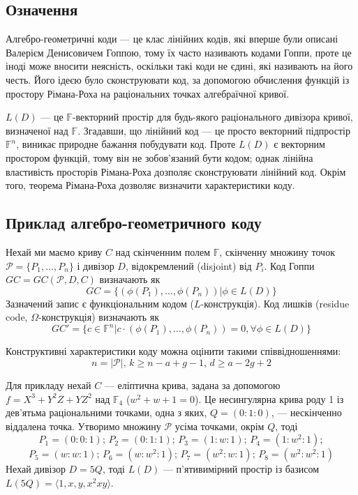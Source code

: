 \documentclass[a4paper,12pt,oneside]{article}
\begin{document}
\subsection{Означення}
Алгебро-геометричні коди --- це клас лінійних кодів, які вперше були описані Валерієм Денисовичем Гоппою, 
тому їх часто називають кодами Гоппи, проте це іноді може вносити неясність, оскільки такі коди не єдині, які називають на його честь. 
Його ідеєю було сконструювати код, за допомогою обчислення функцій із простору Рімана-Роха на раціональних точках алгебраїчної кривої. 

$L(D)$ --- це $\mathbb{F}$-векторний простір для будь-якого раціонального дивізора кривої, визначеної над $\mathbb{F}$. 
Згадавши, що лінійний код --- це просто векторний підпростір $\mathbb{F}^n$, виникає природне бажання побудувати код. 
Проте $L(D)$ є векторним простором функцій, тому він не зобов'язаний бути кодом; однак лінійна властивість просторів Рімана-Роха дозполяє сконструювати лінійний код. 
Окрім того, теорема Рімана-Роха дозволяє визначити характеристики коду.

\subsection{Приклад алгебро-геометричного коду}
Нехай ми маємо криву $C$ над скінченним полем $\mathbb{F}$, скінченну множину точок $\mathcal{P} = \{P_1, \dots , P_n \}$ і дивізор $D$, відокремлений (disjoint) від $P_i$. 
Код Гоппи $GC = GC(\mathcal{P}, D, C)$ визначають як
$$GC = \{ (\phi(P_1), \dots , \phi(P_n)) | \phi \in L(D) \}$$
Зазначений запис є функціональним кодом ($L$-конструкція). Код лишків (residue code, $\Omega$-конструкція) визначають як
$$GC' = \{ c \in \mathbb{F}^n | c \cdot (\phi(P_1), \dots , \phi(P_n)) = 0, \forall \phi \in L(D) \}$$

Конструктивні характеристики коду можна оцінити такими співвідношеннями:
$$n=|\mathcal{P}|, \, k \ge n-a+g-1, \, d \ge a-2g+2$$

Для прикладу нехай $C$ --- еліптична крива, задана за допомогою $f=X^3+Y^2Z+YZ^2$ над $\mathbb{F}_4$ ($w^2+w+1=0$). 
Це несингулярна крива роду 1 із дев'ятьма раціональними точками, одна з яких, $Q=(0:1:0)$, --- нескінченно віддалена точка. 
Утворимо множину $\mathcal{P}$ усіма точками, окрім $Q$, тоді
$$P_1 = (0 : 0 : 1); \, P_2 = (0 : 1 : 1); \, P_3 = (1 : w : 1); \, P_4 = (1 : w^2 : 1);$$ 
$$P_5 = (w : w : 1); \, P_6 = (w : w^2 : 1); \, P_7 = (w^2 : w : 1); \, P_8 = (w^2 : w^2 : 1)$$
Нехай дивізор $D=5Q$, тоді $L(D)$ --- п'ятивимірний простір із базисом $L(5Q) = \langle 1, x, y, x^2 xy \rangle$.
\end{document}

